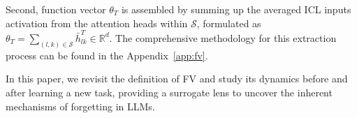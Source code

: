 Second, function vector $\theta_T$ is assembled by summing up the averaged ICL inputs activation from the attention heads within $\mathcal{S}$, formulated as $\theta_T=\sum_{(l, k)\in \mathcal{S}} \bar{h}_{lk}^T \in \mathbb{R}^d$. The comprehensive methodology for this extraction process can be found in the Appendix~\ref{app:fv}.


In this paper, we revisit the definition of FV and study its dynamics before and after learning a new task, providing a surrogate lens to uncover the inherent mechanisms of forgetting in LLMs. 


